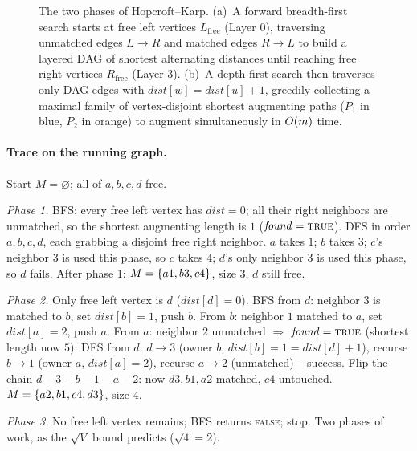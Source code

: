 \begin{figure}[H]
\caption{The two phases of Hopcroft--Karp. (a)~A forward breadth-first
search starts at free left vertices $L_{\mathrm{free}}$ (Layer 0), traversing
unmatched edges $L \to R$ and matched edges $R \to L$ to build a layered DAG of
shortest alternating distances until reaching free right vertices
$R_{\mathrm{free}}$ (Layer 3). (b)~A depth-first search then traverses only DAG
edges with $\mathit{dist}[w] = \mathit{dist}[u]+1$, greedily collecting a maximal
family of vertex-disjoint shortest augmenting paths ($P_1$ in blue, $P_2$ in orange)
to augment simultaneously in $O(m)$ time.}
\label{ch15:fig-hopcroft-karp}
\end{figure}

\paragraph{Trace on the running graph.}
Start $M=\varnothing$; all of $a,b,c,d$ free.

\emph{Phase 1.} BFS: every free left vertex has $\mathit{dist}=0$; all their
right neighbors are unmatched, so the shortest augmenting length is $1$
($\mathit{found}=\textsc{true}$). DFS in order $a,b,c,d$, each grabbing a
disjoint free right neighbor. $a$ takes $1$; $b$ takes $3$; $c$'s neighbor $3$ is
used this phase, so $c$ takes $4$; $d$'s only neighbor $3$ is used this phase, so
$d$ fails. After phase 1: $M=\{a1,b3,c4\}$, size $3$, $d$ still free.

\emph{Phase 2.} Only free left vertex is $d$ ($\mathit{dist}[d]=0$). BFS from $d$:
neighbor $3$ is matched to $b$, set $\mathit{dist}[b]=1$, push $b$. From $b$:
neighbor $1$ matched to $a$, set $\mathit{dist}[a]=2$, push $a$. From $a$:
neighbor $2$ unmatched $\Rightarrow$ $\mathit{found}=\textsc{true}$ (shortest
length now $5$). DFS from $d$: $d\!\to\!3$ (owner $b$,
$\mathit{dist}[b]=1=\mathit{dist}[d]+1$), recurse $b\!\to\!1$ (owner $a$,
$\mathit{dist}[a]=2$), recurse $a\!\to\!2$ (unmatched) -- success. Flip the chain
$d\!-\!3\!-\!b\!-\!1\!-\!a\!-\!2$: now $d3,b1,a2$ matched, $c4$ untouched.
$M=\{a2,b1,c4,d3\}$, size $4$.

\emph{Phase 3.} No free left vertex remains; BFS returns \textsc{false}; stop.
Two phases of work, as the $\sqrt{V}$ bound predicts ($\sqrt{4}=2$).


